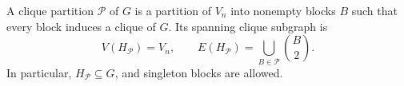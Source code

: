 A clique partition \(\mathcal P\) of \(G\) is a partition of \(V_n\) into nonempty blocks \(B\) such that every block induces a clique of \(G\). Its spanning clique subgraph is
\[
V(H_{\mathcal P})=V_n,
\qquad
E(H_{\mathcal P})=\bigcup_{B\in\mathcal P}\binom{B}{2}.
\]
In particular, \(H_{\mathcal P}\subseteq G\), and singleton blocks are allowed.